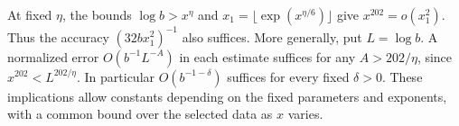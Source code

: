 At fixed $\eta$, the bounds $\log b>x^\eta$ and
$x_1=\lfloor\exp(x^{\eta/6})\rfloor$ give $x^{202}=o(x_1^2)$.
Thus the accuracy $(32b x_1^2)^{-1}$ also suffices. More generally,
put $L=\log b$. A normalized error $O(b^{-1}L^{-A})$ in each
estimate suffices for any $A>202/\eta$, since $x^{202}<L^{202/\eta}$.
In particular $O(b^{-1-\delta})$ suffices for every fixed $\delta>0$.
These implications allow constants depending on the fixed parameters
and exponents, with a common bound over the selected data as $x$ varies.
